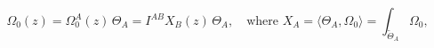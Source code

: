 \begin{equation}
 \Omega_0(z) = \Omega_0^A(z) \, \Theta_A = I^{AB} X_B(z) \, \Theta_A, \quad \mbox{where } X_A
 = \langle \Theta_A, \Omega_0 \rangle = \int_{\widetilde{\Theta}_A}
\Omega_0,
\end{equation}

